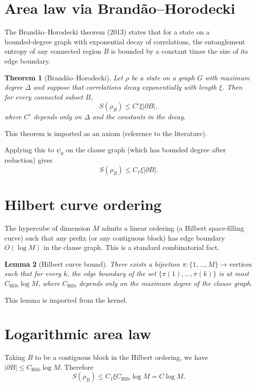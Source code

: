 \documentclass[11pt,a4paper]{article}
\newtheorem{theorem}{Theorem}[section]
\newtheorem{lemma}[theorem]{Lemma}
\begin{document}
\section{Area law via Brandão–Horodecki}

The Brandão–Horodecki theorem (2013) states that for a state on a bounded‑degree graph with exponential decay of correlations, the entanglement entropy of any connected region $B$ is bounded by a constant times the size of its edge boundary.

\begin{theorem}[Brandão–Horodecki]\label{thm:brandao}
Let $\rho$ be a state on a graph $G$ with maximum degree $\Delta$ and suppose that correlations decay exponentially with length $\xi$. Then for every connected subset $B$,
\[
S(\rho_B) \le C' \xi |\partial B|,
\]
where $C'$ depends only on $\Delta$ and the constants in the decay.
\end{theorem}
This theorem is imported as an axiom (reference to the literature).

Applying this to $\psi_0$ on the clause graph (which has bounded degree after reduction) gives
\[
S(\rho_B) \le C_1 \xi |\partial B|.
\]

\section{Hilbert curve ordering}

The hypercube of dimension $M$ admits a linear ordering (a Hilbert space‑filling curve) such that any prefix (or any contiguous block) has edge boundary $O(\log M)$ in the clause graph. This is a standard combinatorial fact.

\begin{lemma}[Hilbert curve bound]\label{lem:hilbert}
There exists a bijection $\pi : \{1,\dots,M\} \to \text{vertices}$ such that for every $k$, the edge boundary of the set $\{\pi(1),\dots,\pi(k)\}$ is at most $C_{\text{Hilb}} \log M$, where $C_{\text{Hilb}}$ depends only on the maximum degree of the clause graph.
\end{lemma}
This lemma is imported from the kernel.

\section{Logarithmic area law}

Taking $B$ to be a contiguous block in the Hilbert ordering, we have $|\partial B| \le C_{\text{Hilb}} \log M$. Therefore
\[
S(\rho_B) \le C_1 \xi C_{\text{Hilb}} \log M = C \log M.
\]
\end{document}
